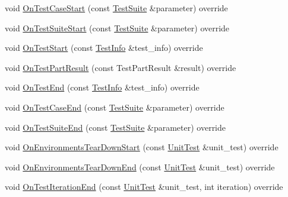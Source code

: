 \begin{DoxyCompactItemize}
\item 
void \mbox{\hyperlink{classtesting_1_1internal_1_1_test_event_repeater_a76cf742eacd1c048b81dc3a1138f55ab}{On\+Test\+Case\+Start}} (const \mbox{\hyperlink{classtesting_1_1_test_suite}{Test\+Suite}} \&parameter) override
\item 
void \mbox{\hyperlink{classtesting_1_1internal_1_1_test_event_repeater_aa54fdafe6dfdd46dbac108c17016a5f9}{On\+Test\+Suite\+Start}} (const \mbox{\hyperlink{classtesting_1_1_test_suite}{Test\+Suite}} \&parameter) override
\item 
void \mbox{\hyperlink{classtesting_1_1internal_1_1_test_event_repeater_a4522c01f10f98d9e5bd97c7e94f3d2bf}{On\+Test\+Start}} (const \mbox{\hyperlink{classtesting_1_1_test_info}{Test\+Info}} \&test\+\_\+info) override
\item 
void \mbox{\hyperlink{classtesting_1_1internal_1_1_test_event_repeater_aaf15a326277f2b2900f8b3624fb27562}{On\+Test\+Part\+Result}} (const Test\+Part\+Result \&result) override
\item 
void \mbox{\hyperlink{classtesting_1_1internal_1_1_test_event_repeater_a0f524b2773bf2cbf6df1269975c5a79f}{On\+Test\+End}} (const \mbox{\hyperlink{classtesting_1_1_test_info}{Test\+Info}} \&test\+\_\+info) override
\item 
void \mbox{\hyperlink{classtesting_1_1internal_1_1_test_event_repeater_a78ea68cab4207e0fd458ced444f42ef5}{On\+Test\+Case\+End}} (const \mbox{\hyperlink{classtesting_1_1_test_suite}{Test\+Suite}} \&parameter) override
\item 
void \mbox{\hyperlink{classtesting_1_1internal_1_1_test_event_repeater_a59e442d1f79ea186499ef99284a60d4c}{On\+Test\+Suite\+End}} (const \mbox{\hyperlink{classtesting_1_1_test_suite}{Test\+Suite}} \&parameter) override
\item 
void \mbox{\hyperlink{classtesting_1_1internal_1_1_test_event_repeater_aa2bf25212c9b1c09ed80b2bbcf55dbba}{On\+Environments\+Tear\+Down\+Start}} (const \mbox{\hyperlink{classtesting_1_1_unit_test}{Unit\+Test}} \&unit\+\_\+test) override
\item 
void \mbox{\hyperlink{classtesting_1_1internal_1_1_test_event_repeater_a0bc5fc45653d32b5e1bcad059ee7616b}{On\+Environments\+Tear\+Down\+End}} (const \mbox{\hyperlink{classtesting_1_1_unit_test}{Unit\+Test}} \&unit\+\_\+test) override
\item 
void \mbox{\hyperlink{classtesting_1_1internal_1_1_test_event_repeater_aa4a52e544380946ff86fc57915aa7152}{On\+Test\+Iteration\+End}} (const \mbox{\hyperlink{classtesting_1_1_unit_test}{Unit\+Test}} \&unit\+\_\+test, int iteration) override

\end{DoxyCompactItemize}
